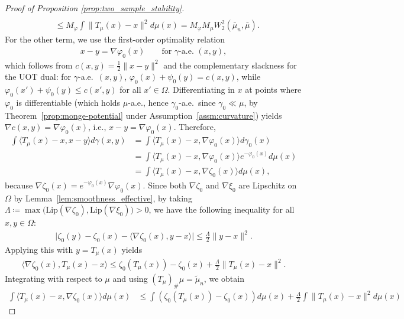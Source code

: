 \documentclass[11pt,reqno]{amsart}
\theoremstyle{definition}
\renewcommand{\tilde}{\widetilde}
\begin{document}
\begin{proof}[Proof of Proposition \ref{prop:two_sample_stability}]
\begin{align}
    \\
    &\le
    M_\varphi \int \|T_\mu(x)-x\|^2 d\mu(x)
    =
    M_\varphi M_\mu W_2^2(\bar\mu_n, \bar\mu).
\end{align}
For the other term, we use the first-order optimality relation
\begin{align*}
    x-y = \nabla \varphi_0(x)
    \qquad\text{for $\gamma$-a.e.\ }(x,y),
\end{align*}
which follows from $c(x,y)=\tfrac{1}{2}\|x-y\|^2$ and the complementary slackness for the
UOT dual: for $\gamma$-a.e.\ $(x,y)$, $\varphi_0(x)+\psi_0(y)=c(x,y)$, while
$\varphi_0(x')+\psi_0(y)\le c(x',y)$ for all $x'\in\Omega$. Differentiating in $x$
at points where $\varphi_0$ is differentiable (which holds $\mu$-a.e., hence
$\gamma_0$-a.e.\ since $\gamma_0\ll\mu$, by Theorem~\ref{prop:monge-potential}
under Assumption~\ref{assm:curvature}) yields $\nabla c(x,y)=\nabla\varphi_0(x)$,
i.e., $x-y=\nabla\varphi_0(x)$.
Therefore,
\begin{align*}
    \int \langle T_\mu(x)-x, x-y \rangle d\gamma(x,y)
    &=
    \int \langle T_\mu(x)-x, \nabla \varphi_0(x) \rangle d\gamma_0(x)
    \\
    &=
    \int \langle T_\mu(x)-x, \nabla \varphi_0(x) \rangle e^{-\varphi_0(x)} d\mu(x)
    \\
    &=
    \int \langle T_\mu(x)-x, \nabla \zeta_0(x) \rangle d\mu(x),
\end{align*}
because $\nabla \zeta_0(x)=e^{-\varphi_0(x)}\nabla \varphi_0(x)$.
Since both $\nabla \zeta_0$ and $\nabla \xi_0$ are Lipschitz on $\Omega$ by Lemma~\ref{lem:smoothness_effective}, by taking
$\Lambda \coloneqq \max\bigl(\mathrm{Lip}(\nabla\zeta_0),\mathrm{Lip}(\nabla\xi_0)\bigr)>0$,
we have the following inequality for all $x,y\in\Omega$:
\begin{align*}
    \bigl|\zeta_0(y)-\zeta_0(x)-\langle \nabla\zeta_0(x),y-x\rangle\bigr|
    \le
    \frac{\Lambda}{2}\|y-x\|^2.
\end{align*}
Applying this with $y=T_\mu(x)$ yields
\begin{align*}
    \langle \nabla \zeta_0(x), T_\mu(x)-x \rangle
    \le
    \zeta_0(T_\mu(x))-\zeta_0(x)+\frac{\Lambda}{2}\|T_\mu(x)-x\|^2.
\end{align*}
Integrating with respect to $\mu$ and using $(T_\mu)_\#\mu=\tilde\mu_n$, we obtain
\begin{align*}
    \int \langle T_\mu(x)-x, \nabla \zeta_0(x) \rangle d\mu(x)
    &\le
    \int (\zeta_0(T_\mu(x))-\zeta_0(x)) d\mu(x)
    + \frac{\Lambda}{2}\int \|T_\mu(x)-x\|^2 d\mu(x)

\end{align*}
\end{proof}
\end{document}
